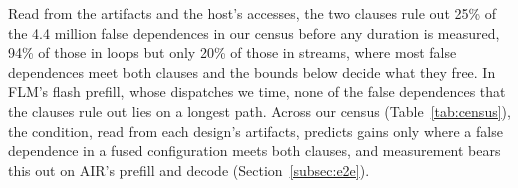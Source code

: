 \label{subsec:observed}
Read from the artifacts and the host's accesses, the two clauses rule out 25\% of the 4.4 million false dependences in our census before any duration is measured, 94\% of those in loops but only 20\% of those in streams, where most false dependences meet both clauses and the bounds below decide what they free.
In FLM's flash prefill, whose dispatches we time, none of the false dependences that the clauses rule out lies on a longest path.
Across our census (Table~\ref{tab:census}), the condition, read from each design's artifacts, predicts gains only where a false dependence in a fused configuration meets both clauses, and measurement bears this out on AIR's prefill and decode (Section~\ref{subsec:e2e}).
